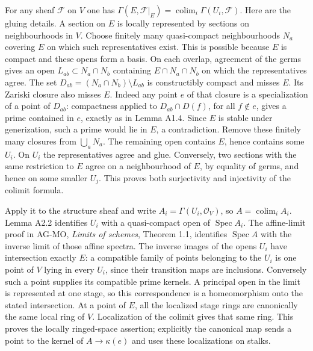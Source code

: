 \documentclass[11pt,a4paper,openany]{report}
\begin{document}
For any sheaf \(\mathcal F\) on \(V\) one has \(\Gamma(E,\mathcal F|_E)=\operatorname{colim}_i\Gamma(U_i,\mathcal F)\). Here are the gluing details. A section on \(E\) is locally represented by sections on neighbourhoods in \(V\). Choose finitely many quasi-compact neighbourhoods \(N_a\) covering \(E\) on which such representatives exist. This is possible because \(E\) is compact and these opens form a basis. On each overlap, agreement of the germs gives an open \(L_{ab}\subset N_a\cap N_b\) containing \(E\cap N_a\cap N_b\) on which the representatives agree. The set \(D_{ab}=(N_a\cap N_b)\setminus L_{ab}\) is constructibly compact and misses \(E\). Its Zariski closure also misses \(E\). Indeed any point \(e\) of that closure is a specialization of a point of \(D_{ab}\): compactness applied to \(D_{ab}\cap D(f)\), for all \(f\notin e\), gives a prime contained in \(e\), exactly as in Lemma A1.4. Since \(E\) is stable under generization, such a prime would lie in \(E\), a contradiction. Remove these finitely many closures from \(\bigcup_a N_a\). The remaining open contains \(E\), hence contains some \(U_i\). On \(U_i\) the representatives agree and glue. Conversely, two sections with the same restriction to \(E\) agree on a neighbourhood of \(E\), by equality of germs, and hence on some smaller \(U_j\). This proves both surjectivity and injectivity of the colimit formula.

Apply it to the structure sheaf and write \(A_i=\Gamma(U_i,\mathcal O_V)\), so \(A=\operatorname{colim}_i A_i\). Lemma A2.2 identifies \(U_i\) with a quasi-compact open of \(\operatorname{Spec}A_i\). The affine-limit proof in AG-MO, \emph{Limits of schemes}, Theorem 1.1, identifies \(\operatorname{Spec}A\) with the inverse limit of those affine spectra. The inverse images of the opens \(U_i\) have intersection exactly \(E\): a compatible family of points belonging to the \(U_i\) is one point of \(V\) lying in every \(U_i\), since their transition maps are inclusions. Conversely such a point supplies its compatible prime kernels. A principal open in the limit is represented at one stage, so this correspondence is a homeomorphism onto the stated intersection. At a point of \(E\), all the localized stage rings are canonically the same local ring of \(V\). Localization of the colimit gives that same ring. This proves the locally ringed-space assertion; explicitly the canonical map sends a point to the kernel of \(A\to\kappa(e)\) and uses these localizations on stalks.
\end{document}
